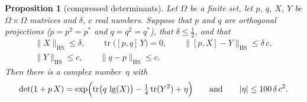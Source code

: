 \documentclass[11pt,a4paper]{article}
\newcommand{\m}[1]{\mbox{$#1$}}        %
\theoremstyle{plainx}
\newtheorem{proposition}[theorem]{Proposition}
\theoremstyle{uprightx}
\newcommand{\abs}[1]{\lvert #1\rvert}
\newcommand{\hs}[1]{\lVert #1\rVert_{\mathrm{HS}}}
\newcommand{\tr}{\operatorname{tr}}
\newcommand{\comm}[2]{[#1,#2]}
\newcommand{\lgo}[1]{\operatorname{lg}(#1)}              %
\begin{document}
\begin{proposition}[compressed determinants]\label{p:compress}
Let $\Omega$ be a finite set, let $p$, $q$, $X$, $Y$ be \m{\Omega\times\Omega} matrices and $\delta$, $c$ real numbers.
Suppose that $p$ and $q$ are orthogonal projections \textup{(}\m{p=p^{2}=p^{*}} and \m{q=q^{2}=q^{*}}\textup{)}, that
\m{\delta\le\tfrac12}, and that
\[\begin{gathered}\hs{X}\le\delta,\qquad \tr\bigl(\comm{p}{q}\,Y\bigr)=0,\qquad \hs{\comm{p}{X}-Y}\le\delta\,c,\\
\hs{Y}\le c,\qquad \hs{q-p}\le c.\end{gathered}\]
Then there is a complex number~$\eta$ with
\[\det(1+p\,X)=\exp\Bigl(\tr\bigl(q\,\lgo{X}\bigr)-\tfrac14\tr(Y^{2})+\eta\Bigr)\qquad\text{and}\qquad \abs{\eta}\le100\,\delta\,c^{2}.\]
\end{proposition}
\end{document}
